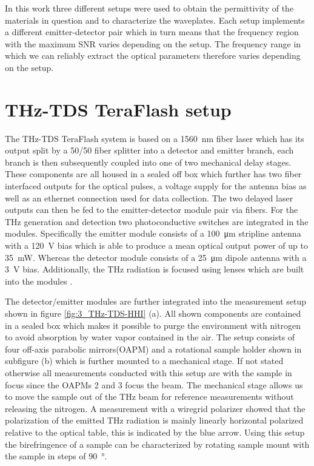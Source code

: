 
In this work three different setups were used to obtain the permittivity of the materials in question and to characterize the waveplates. Each setup implements a different emitter-detector pair which in turn means that the frequency region with the maximum SNR varies depending on the setup. The frequency range in which we can reliably extract the optical parameters therefore varies depending on the setup. 

\section{THz-TDS TeraFlash setup}
The THz-TDS TeraFlash system is based on a \SI{1560}{\nano \meter} fiber laser which has its output split by a 50/50 fiber splitter into a detector and emitter branch, each branch is then subsequently coupled into one of two mechanical delay stages. These components are all housed in a sealed off box which further has two fiber interfaced outputs for the optical pulses, a voltage supply for the antenna bias as well as an ethernet connection used for data collection. The two delayed laser outputs can then be fed to the emitter-detector module pair via fibers. For the THz generation and detection two photoconductive  switches are integrated in the modules. Specifically the emitter module consists of a \SI{100}{\micro \meter} stripline antenna with a \SI{+120}{\volt} bias which is able to produce a mean optical output power of up to \SI{35}{\milli \watt}. Whereas the detector module consists of a \SI{25}{\micro \meter} dipole antenna with a \SI{3}{\volt} bias. Additionally, the THz radiation is focused using  lenses which are built into the modules \cite{Vieweg2014}.

The detector/emitter modules are further integrated into the measurement setup shown in figure \ref{fig:3_THz-TDS-HHI} (a). All shown components are contained in a sealed box which makes it possible to purge the environment with nitrogen to avoid absorption by water vapor contained in the air. The setup consists of four off-axis parabolic mirrors(OAPM) and a rotational sample holder shown in subfigure (b) which is further mounted to a mechanical stage. If not stated otherwise all measurements conducted with this setup are with the sample in focus since the OAPMs 2 and 3 focus the beam. The mechanical stage allows us to move the sample out of the THz beam for reference measurements without releasing the nitrogen. A measurement with a wiregrid polarizer showed that the polarization of the emitted THz radiation is mainly linearly horizontal polarized relative to the optical table, this is indicated by the blue arrow. Using this setup the birefringence of a sample can be characterized by rotating sample mount with the sample in steps of \SI{90}{\degree}.

